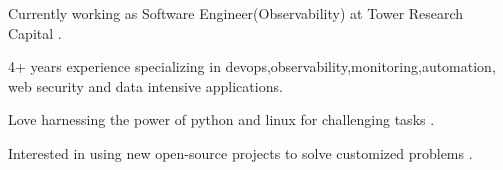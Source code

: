 

\begin{cvparagraph}

Currently working as Software Engineer(Observability) at Tower Research Capital .

 4+ years experience specializing in devops,observability,monitoring,automation, web security and data intensive applications.

 Love harnessing the power of python and linux for challenging tasks .

 Interested in using new open-source projects to solve customized problems .
\end{cvparagraph}

